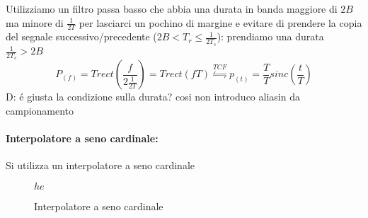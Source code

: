         Utilizziamo un filtro passa basso che abbia una durata in banda maggiore di $2B$ ma minore di $\frac{1}{2T}$  per lasciarci un pochino di margine e evitare  di prendere 
        la copia del segnale successivo/precedente ($2B<T_r\leq\frac{1}{2T_s}$): prendiamo una durata $\frac{1}{2T_s}>2B$
        \[
            P_{(f)} = T rect\left(\frac{f}{2\frac{1}{2T}}\right)= T rect\left(fT\right) \overset{TCF}{\leftrightharpoons} p_{(t)} = \frac{T}{T}sinc\left(\frac{t}{T}\right)
        \]
        {\color{red}D:} é giusta la condizione sulla durata? cosi non introduco aliasin da campionamento
        \paragraph{Interpolatore a seno cardinale:} Si utilizza un interpolatore a seno cardinale
            \begin{figure}[H] $he$
                \centering
                \caption{Interpolatore a seno cardinale}
                \label{fig:interpolatore a seno cardinale}
            \end{figure}
